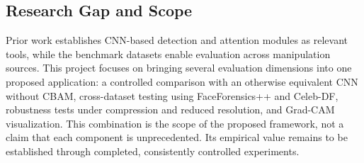 \subsection{Research Gap and Scope}
Prior work establishes CNN-based detection and attention modules as relevant tools, while the benchmark datasets enable evaluation across manipulation sources. This project focuses on bringing several evaluation dimensions into one proposed application: a controlled comparison with an otherwise equivalent CNN without CBAM, cross-dataset testing using FaceForensics++ and Celeb-DF, robustness tests under compression and reduced resolution, and Grad-CAM visualization. This combination is the scope of the proposed framework, not a claim that each component is unprecedented. Its empirical value remains to be established through completed, consistently controlled experiments.
